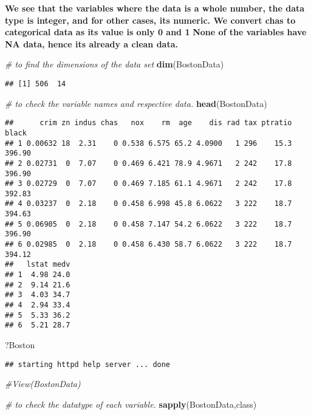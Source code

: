\documentclass[]{article}
\newenvironment{Shaded}{\begin{snugshade}}{\end{snugshade}}
\newcommand{\CommentTok}[1]{\textcolor[rgb]{0.56,0.35,0.01}{\textit{#1}}}
\newcommand{\KeywordTok}[1]{\textcolor[rgb]{0.13,0.29,0.53}{\textbf{#1}}}
\newcommand{\NormalTok}[1]{#1}
\begin{document}
\textbf{We see that the variables where the data is a whole number, the
data type is integer, and for other cases, its numeric. We convert chas
to categorical data as its value is only 0 and 1} \textbf{None of the
variables have NA data, hence its already a clean data.}

\begin{Shaded}
\begin{Highlighting}[]
\CommentTok{# to find the dimensions of the data set}
\KeywordTok{dim}\NormalTok{(BostonData)}
\end{Highlighting}
\end{Shaded}

\begin{verbatim}
## [1] 506  14
\end{verbatim}

\begin{Shaded}
\begin{Highlighting}[]
\CommentTok{# to check the variable names and respective data.}
\KeywordTok{head}\NormalTok{(BostonData)}
\end{Highlighting}
\end{Shaded}

\begin{verbatim}
##      crim zn indus chas   nox    rm  age    dis rad tax ptratio  black
## 1 0.00632 18  2.31    0 0.538 6.575 65.2 4.0900   1 296    15.3 396.90
## 2 0.02731  0  7.07    0 0.469 6.421 78.9 4.9671   2 242    17.8 396.90
## 3 0.02729  0  7.07    0 0.469 7.185 61.1 4.9671   2 242    17.8 392.83
## 4 0.03237  0  2.18    0 0.458 6.998 45.8 6.0622   3 222    18.7 394.63
## 5 0.06905  0  2.18    0 0.458 7.147 54.2 6.0622   3 222    18.7 396.90
## 6 0.02985  0  2.18    0 0.458 6.430 58.7 6.0622   3 222    18.7 394.12
##   lstat medv
## 1  4.98 24.0
## 2  9.14 21.6
## 3  4.03 34.7
## 4  2.94 33.4
## 5  5.33 36.2
## 6  5.21 28.7
\end{verbatim}

\begin{Shaded}
\begin{Highlighting}[]
\NormalTok{?Boston}
\end{Highlighting}
\end{Shaded}

\begin{verbatim}
## starting httpd help server ... done
\end{verbatim}

\begin{Shaded}
\begin{Highlighting}[]
\CommentTok{#View(BostonData)}

\CommentTok{# to check the datatype of each variable.}
\KeywordTok{sapply}\NormalTok{(BostonData,class)}
\end{Highlighting}
\end{Shaded}
\end{document}
